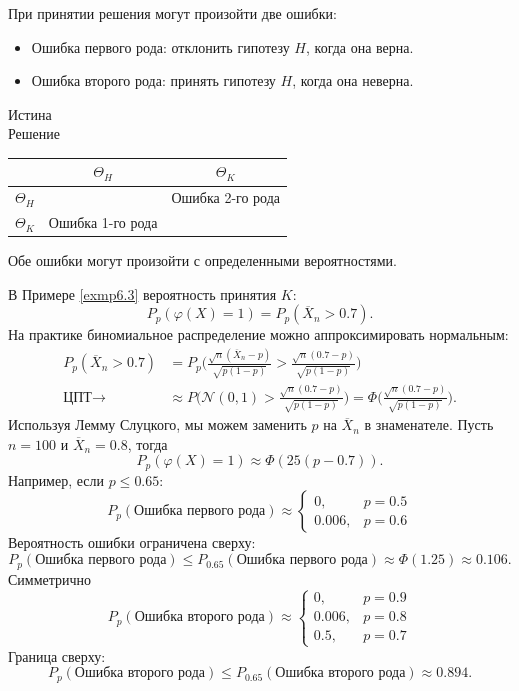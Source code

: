 \begin{rmrk}
	При принятии решения могут произойти две ошибки:
	\begin{itemize}
		\item Ошибка первого рода: отклонить гипотезу $H$, когда она верна.
		\item Ошибка второго рода: принять гипотезу $H$, когда она неверна.
	\end{itemize}
	\begin{center}
		\quad\quad\quad\quad\quad\quad\quad Истина \\
		Решение
		\begin{tabular}{| c | c | c|}
			\hline
			& $\Theta_H$ & $\Theta_K$ \\
			\hline
		 $\Theta_H$ & \checkmark & Ошибка 2-го рода \\
		\hline
			 $\Theta_K$ & Ошибка 1-го рода & \checkmark \\
			 \hline
		\end{tabular}
	\end{center}
	Обе ошибки могут произойти с определенными вероятностями.
\end{rmrk}

\begin{exmp}
	В Примере \ref{exmp6.3} вероятность принятия $K$:
	\[ P_p(\varphi(X)=1)=P_p(\overline{X}_n > 0.7). \]
	На практике биномиальное распределение можно аппроксимировать нормальным:
	\[
	\begin{aligned}
	P_p(\overline{X}_n > 0.7) & = P_p\bigg(\frac{\sqrt{n}(\overline{X}_n - p)}{\sqrt{p(1-p)}} > \frac{\sqrt{n}(0.7 - p)}{\sqrt{p(1-p)}}\bigg) \\
	\text{ЦПТ} \rightarrow & \approx P\bigg(\mathcal{N}(0,1) > \frac{\sqrt{n}(0.7 - p)}{\sqrt{p(1-p)}}\bigg) = \Phi\bigg(\frac{\sqrt{n}(0.7 - p)}{\sqrt{p(1-p)}}\bigg).
	\end{aligned}	 
	\]
	Используя Лемму Слуцкого, мы можем заменить $p$ на $\overline{X}_n$ в знаменателе. Пусть $n=100$ и $\overline{X}_n = 0.8$, тогда
	\[ P_p(\varphi(X)=1) \approx \Phi(25(p-0.7)).  \]
	Например, если $p \leq 0.65$:
	\[ P_p(\text{Ошибка первого рода}) \approx
	\left \{
	\begin{array}{cl}
	0, & p = 0.5 \\
	0.006, &  p = 0.6
	\end{array}
	\right.
	\]
	Вероятность ошибки ограничена сверху:
	\[ P_p(\text{Ошибка первого рода}) \leq P_{0.65}(\text{Ошибка первого рода}) \approx \Phi(1.25) \approx 0.106. \]
	Симметрично
	\[ P_p(\text{Ошибка второго рода}) \approx
	\left \{
	\begin{array}{cl}
	0, & p = 0.9 \\
	0.006, &  p = 0.8 \\
	0.5, & p = 0.7
	\end{array}
	\right.
	\]
	Граница сверху:
	\[ P_p(\text{Ошибка второго рода}) \leq P_{0.65}(\text{Ошибка второго рода}) \approx 0.894. \]
\end{exmp}

